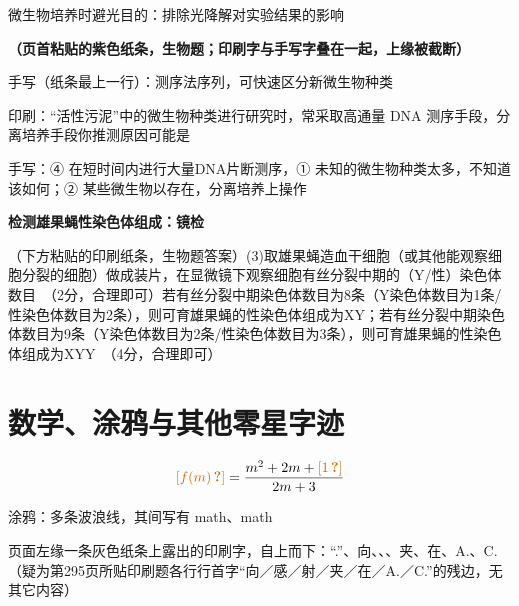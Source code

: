 微生物培养时避光目的：排除光降解对实验结果的影响

\textbf{（页首粘贴的紫色纸条，生物题；印刷字与手写字叠在一起，上缘被截断）}

手写（纸条最上一行）：测序法序列，可快速区分新微生物种类

印刷：“活性污泥”中的微生物种类进行研究时，常采取高通量 DNA 测序手段，分离培养手段你推测原因可能是

手写：④ 在短时间内进行大量DNA片断测序，① 未知的微生物种类太多，不知道该如何；② 某些微生物以存在，分离培养上操作

\textbf{检测雄果蝇性染色体组成：镜检}

（下方粘贴的印刷纸条，生物题答案）(3)取雄果蝇造血干细胞（或其他能观察细胞分裂的细胞）做成装片，在显微镜下观察细胞有丝分裂中期的（Y/性）染色体数目\ （2分，合理即可）若有丝分裂中期染色体数目为8条（Y染色体数目为1条/性染色体数目为2条），则可育雄果蝇的性染色体组成为XY；若有丝分裂中期染色体数目为9条（Y染色体数目为2条/性染色体数目为3条），则可育雄果蝇的性染色体组成为XYY\ （4分，合理即可）


\section{数学、涂鸦与其他零星字迹}
\[ \unclear{f(m)}=\dfrac{m^{2}+2m+\unclear{1}}{2m+3} \]


涂鸦：多条波浪线，其间写有 math、math

页面左缘一条灰色纸条上露出的印刷字，自上而下：“.”、向、、、夹、在、A.、C.（疑为第295页所贴印刷题各行行首字“向／感／射／夹／在／A.／C.”的残边，无其它内容）

